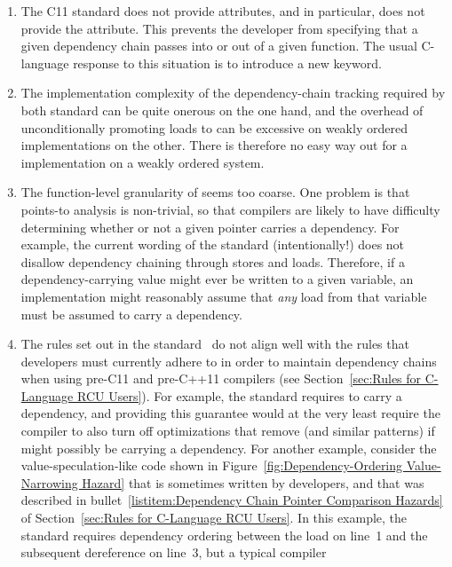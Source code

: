 \documentclass[letterpaper,twocolumn,10pt]{article}
\begin{document}
\begin{enumerate}
\item	The C11 standard does not provide attributes, and in particular,
	does not provide the  attribute.
	This prevents the developer from specifying that a given
	dependency chain passes into or out of a given function.
	The usual C-language response to this situation is to introduce
	a new keyword.
\item	The implementation complexity of the dependency-chain tracking
	required by both standard can be quite onerous on the one hand,
	and the overhead of unconditionally promoting 
	loads to  can be excessive on
	weakly ordered implementations on the other.
	There is therefore no easy way out for a 
	implementation on a weakly ordered system.
\item	The function-level granularity of 
	seems too coarse.
	One problem is that points-to analysis is non-trivial, so that
	compilers are likely to have difficulty determining whether or
	not a given pointer carries a dependency.
	For example, the current wording of the standard (intentionally!)
	does not disallow dependency chaining through stores and loads.
	Therefore,
	if a dependency-carrying value might ever be written to a
	given variable,
	an implementation might reasonably assume that
	\emph{any} load from that variable must be assumed
	to carry a dependency.
\item	The rules set out in the standard~\cite[1.10p11]{RichardSmith2015N4527}
	do not align well with the rules that developers must currently
	adhere to in order to maintain dependency chains when using
	pre-C11 and pre-C++11 compilers
	(see Section~\ref{sec:Rules for C-Language RCU Users}).
	For example, the standard requires  to carry a dependency,
	and providing this guarantee would at the very least require the
	compiler to also turn off optimizations that remove 
	(and similar patterns) if  might possibly be carrying a
	dependency.
	For another example, consider the value-speculation-like code
	shown in
	Figure~\ref{fig:Dependency-Ordering Value-Narrowing Hazard}
	that is sometimes written by developers, and that was
	described in
	bullet~\ref{listitem:Dependency Chain Pointer Comparison Hazards}
	of Section~\ref{sec:Rules for C-Language RCU Users}.
	In this example, the standard requires dependency ordering
	between the  load on line~1 and
	the subsequent dereference on line~3, but a typical compiler

\end{enumerate}
\end{document}
